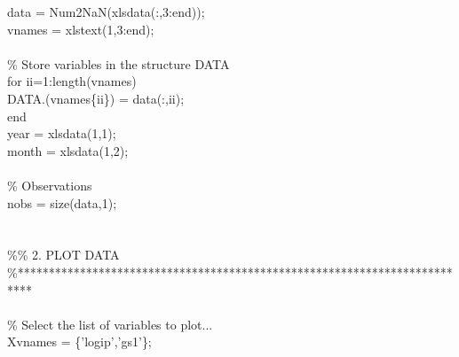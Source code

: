 \hspace{1mm}data   = Num2NaN(xlsdata(:,3:end)); \\ 
\hspace{1mm}vnames = xlstext(1,3:end); \\ 
\hspace{1mm} \\ 
\hspace{1mm}\textcolor{matlabgreen}{\% Store variables in the structure DATA }\\ 
\hspace{1mm}\textcolor{matlabblue}{for} ii=1:length(vnames) \\ 
\hspace{1mm}\hspace{5mm} DATA.(vnames\{ii\}) = data(:,ii); \\ 
\hspace{1mm}\textcolor{matlabblue}{end} \\ 
\hspace{1mm}year = xlsdata(1,1); \\ 
\hspace{1mm}month = xlsdata(1,2); \\ 
\hspace{1mm} \\ 
\hspace{1mm}\textcolor{matlabgreen}{\% Observations }\\ 
\hspace{1mm}nobs = size(data,1); \\ 
\hspace{1mm} \\ 
\hspace{1mm} \\ 
\hspace{1mm}\textcolor{matlabgreen}{\%}\textcolor{matlabgreen}{\% 2. PLOT DATA }\\ 
\hspace{1mm}\textcolor{matlabgreen}{\%**************************************************************************  }\\ 
\hspace{1mm} \\ 
\hspace{1mm}\textcolor{matlabgreen}{\% Select the list of variables to plot... }\\ 
\hspace{1mm}Xvnames      = \{\textcolor{matlabpurple}{'logip'},\textcolor{matlabpurple}{'gs1'}\}; \\ 
\hspace{1mm} \\ 
